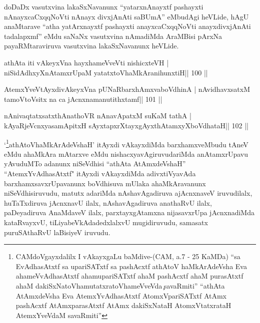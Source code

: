 \begin{artha}
doDaDx vasutxvina lakaSxNavanunx ``\footnotemark[1]yatarxnAnayxtf 
pashayxti nAnayxcaCxqqNoVti nAnayx divxjAnAti saBUmA'' eMbudAgi
heVLide, hAgU anaMtarave ``\footnotemark[1]atha yatArxnayxtf pashayxti
anayxcaCxqqNoVti anayxdivxjAnAti tadalapxmf'' eMdu saNaNx vasutxvina
nAmadiMda AraMBisi pArxNa payaRMtaraviruva vasutxvina lakaSxNavanunx
heVLide. 
\end{artha}


\begin{shl}
athAta iti vAkeyxVna hayxhameVveVti nishicxteVH |
niSidAdhxyXnAtamxrUpaM yatatxtoV\s haMkAranihunxtiH\hfill || 100 ||
\end{shl}

\begin{shl}
AtemxYveVtAyxdivAkeyxVna pUNaRbarxhAmxvaboVdhinA |
nAvidhavxsatxM tamoV\s toV\s sitx na ca jAcnxnamanutithxtamf\hfill || 101 ||
\end{shl}

\begin{shl}
nAnivaqtatxsatxthA\s nathoVR nAnavApatxM suKaM tathA |
kAyaRjeVcnxyasamApitxH sAyxtapxrXtayxgAyxthAtamxyXboVdhataH\hfill || 102 ||
\end{shl}

\begin{artha}
`\footnote[1]{CAMdoVgayxdalilx I vAkayxgaLu baMdive-(CAM, a.7 - 25
    KaMDa) ``sa EvAdhasAtxtf sa upariSATxtf sa pashAcxtf athAtoV\s
    haMkArAdeVsha Eva ahameVvAdhasAtxtf ahamupariSATxtf ahaM pashAcxtf
  ahaM purasAtxtf ahaM dakiSxNatoV\s hamutatxratoV\s hameVveVda\c\ savaRmiti'' ``athAta AtAmxdeVsha Eva AtemxYvAdhasAtxtf
  AtomxVpariSATxtf AtAmx pashAcxtf AtAmxparasAtxtf AtAmx dakiSxNataH
  AtomxVtatxrataH AtemxYveVdaM savaRmiti''}athAtoV\s haMkArAdeVshaH' 
  itAyxdi vAkayxdiMda barxhamxveMbudu tAneV eMdu ahaMkAra mAtarxve eMdu
  nishacxyavAgiruvudariMda anAtamxrUpavu yAvuduMTo adanunx niSeVdhisi
  ``athAta AtAmxdeVshaH'' ``AtemxYvAdhasAtxtf" itAyxdi vAkayxdiMda
  adivxtiVyavAda barxhamxsavxrUpavanunx boVdhisuva mUlaka
  ahaMkAravanunx niSeVdhisiruvudu, matutx adariMda nAshavAgadiruva
  ajAcnxnaveV iruvudilalx, huTaTxdiruva jAcnxnavU ilalx,
  nAshavAgadiruva anathaRvU ilalx, paDeyadiruva AnaMdaveV ilalx,
  parxtayxgAtamxna nijasavxrUpa jAcnxnadiMda kataRvayxvU,
  tiLiyabeVkAdadedxlalxvU mugidiruvudu, samasatx puruSAthaRvU laBisiyeV
  iruvudu.
\end{artha}

